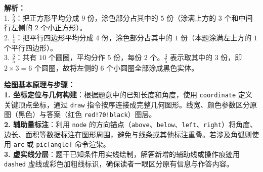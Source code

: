\begin{center}
\end{center}

\vspace{0.6cm}
{\small\color{gray}
\textbf{解析：}\\
1. $\frac{5}{9}$：把正方形平均分成 $9$ 份，涂色部分占其中的 $5$ 份（涂满上方的 $3$ 个和中间行左侧的 $2$ 个小正方形）。\\
2. $\frac{1}{4}$：把平行四边形平均分成 $4$ 份，涂色部分占其中的 $1$ 份（本题涂满左上方的 $1$ 个平行四边形）。\\
3. $\frac{3}{5}$：共有 $10$ 个圆圈，平均分作 $5$ 份，每份 $2$ 个。$\frac{3}{5}$ 表示取其中的 $3$ 份，即 $2 \times 3 = 6$ 个圆圈，故将左侧的 $6$ 个小圆圈全部涂成黑色实体。
}

\vspace{0.8cm}


\vspace{0.6cm}

{\small\color{blue!70!black}
\textbf{绘图基本原理与步骤：}\\
\textbf{1. 坐标定位与几何构建}：根据题意中的已知长度和角度，使用 \texttt{coordinate} 定义关键顶点坐标，通过 \texttt{draw} 指令按序连接成完整几何图形。线宽、颜色参数区分原图（黑色）与答案（红色 \texttt{red!70!black}）图层。\\
\textbf{2. 辅助量标注}：利用 \texttt{node} 的方向锚点（\texttt{above}、\texttt{below}、\texttt{left}、\texttt{right}）将角度、边长、面积等数据标注在图形周围，避免与线条或其他标注重叠。若涉及角弧则使用 \texttt{arc} 或 \texttt{pic[angle]} 命令渲染。\\
\textbf{3. 虚实线分层}：题干已知条件用实线绘制，解答新增的辅助线或操作痕迹用 \texttt{dashed} 虚线或彩色加粗线标识，确保读者一眼区分原有信息与作答内容。
}


